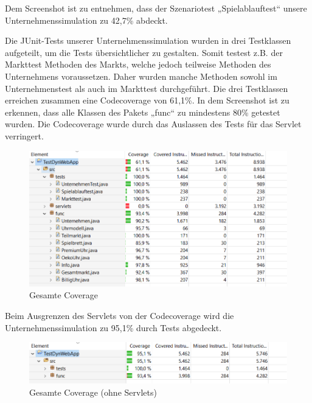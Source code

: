 Dem Screenshot ist zu entnehmen, dass der Szenariotest „Spielablauftest“ unsere Unternehmenssimulation zu 42,7\% abdeckt. 

Die JUnit-Tests unserer Unternehmenssimulation wurden in drei Testklassen aufgeteilt, um die Tests übersichtlicher zu gestalten. Somit testest z.B. der Markttest Methoden des Markts, welche jedoch teilweise Methoden des Unternehmens voraussetzen. Daher wurden manche Methoden sowohl im Unternehmenstest als auch im Markttest durchgeführt. Die drei Testklassen erreichen zusammen eine Codecoverage von 61,1\%. In dem Screenshot ist zu erkennen, dass alle Klassen des Pakets „func“ zu mindestens 80\% getestet wurden. Die Codecoverage wurde durch das Auslassen des Tests für das Servlet verringert. 

\begin{figure}[!h]
	\centering
	\includegraphics[scale=0.8]{img/bild2_tests.png} 
	\caption{Gesamte Coverage} \label{fig:abb32}
\end{figure}

Beim Ausgrenzen des Servlets von der Codecoverage wird die Unternehmenssimulation zu 95,1\% durch Tests abgedeckt. 

\begin{figure}[!h]
	\centering
	\includegraphics[scale=0.8]{img/bild3_tests.png} 
	\caption{Gesamte Coverage (ohne Servlets)} \label{fig:abb33}
\end{figure}







